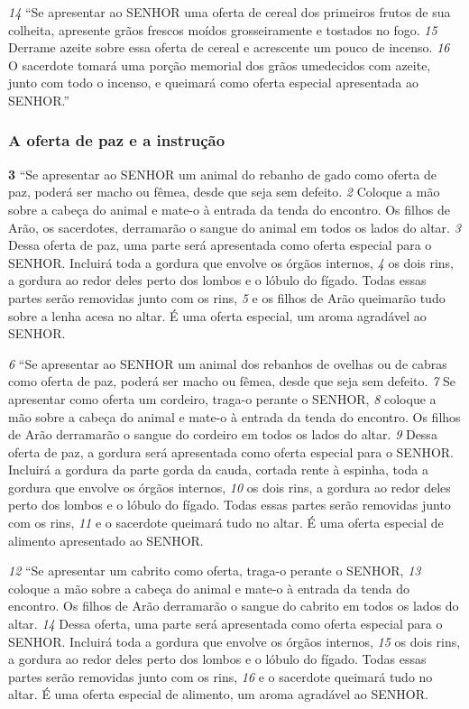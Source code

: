 \smallskip
\textit{\tiny 14}
“Se apresentar ao SENHOR uma oferta de cereal dos primeiros frutos de sua
colheita, apresente grãos frescos moídos grosseiramente e tostados no fogo.
\textit{\tiny 15}
Derrame azeite sobre essa oferta de cereal e acrescente um pouco de incenso.
\textit{\tiny 16}
O sacerdote tomará uma porção memorial dos grãos umedecidos com azeite,
junto com todo o incenso, e queimará como oferta especial apresentada ao
SENHOR.”

\bigskip
\subsubsection*{A oferta de paz e a instrução}
\textbf{\large 3} “Se apresentar ao SENHOR um animal do rebanho de gado como oferta de paz,
poderá ser macho ou fêmea, desde que seja sem defeito. 
\textit{\tiny 2} 
Coloque a mão sobre a
cabeça do animal e mate-o à entrada da tenda do encontro. Os filhos de Arão, os
sacerdotes, derramarão o sangue do animal em todos os lados do altar. 
\textit{\tiny 3} 
Dessa
oferta de paz, uma parte será apresentada como oferta especial para o SENHOR.
Incluirá toda a gordura que envolve os órgãos internos, 
\textit{\tiny 4} 
os dois rins, a gordura ao
redor deles perto dos lombos e o lóbulo do fígado. Todas essas partes serão
removidas junto com os rins, 
\textit{\tiny 5} 
e os filhos de Arão queimarão tudo sobre a lenha
acesa no altar. É uma oferta especial, um aroma agradável ao SENHOR. 

\smallskip
\textit{\tiny 6} 
“Se apresentar ao SENHOR um animal dos rebanhos de ovelhas ou de cabras
como oferta de paz, poderá ser macho ou fêmea, desde que seja sem defeito. 
\smallskip
\textit{\tiny 7} 
Se
apresentar como oferta um cordeiro, traga-o perante o SENHOR, 
\textit{\tiny 8} 
coloque a mão
sobre a cabeça do animal e mate-o à entrada da tenda do encontro. Os filhos de
Arão derramarão o sangue do cordeiro em todos os lados do altar. 
\textit{\tiny 9} 
Dessa oferta
de paz, a gordura será apresentada como oferta especial para o SENHOR. Incluirá a
gordura da parte gorda da cauda, cortada rente à espinha, toda a gordura que
envolve os órgãos internos, 
\textit{\tiny 10}
os dois rins, a gordura ao redor deles perto dos
lombos e o lóbulo do fígado. Todas essas partes serão removidas junto com os
rins, 
\textit{\tiny 11}
e o sacerdote queimará tudo no altar. É uma oferta especial de alimento
apresentado ao SENHOR.
   
\smallskip
\textit{\tiny 12}
“Se apresentar um cabrito como oferta, traga-o perante o SENHOR, 
\textit{\tiny 13}
coloque a
mão sobre a cabeça do animal e mate-o à entrada da tenda do encontro. Os filhos
de Arão derramarão o sangue do cabrito em todos os lados do altar. 
\textit{\tiny 14}
Dessa
oferta, uma parte será apresentada como oferta especial para o SENHOR. Incluirá
toda a gordura que envolve os órgãos internos, 
\textit{\tiny 15}
os dois rins, a gordura ao redor
deles perto dos lombos e o lóbulo do fígado. Todas essas partes serão removidas
junto com os rins, 
\textit{\tiny 16}
e o sacerdote queimará tudo no altar. É uma oferta especial
de alimento, um aroma agradável ao SENHOR. 

